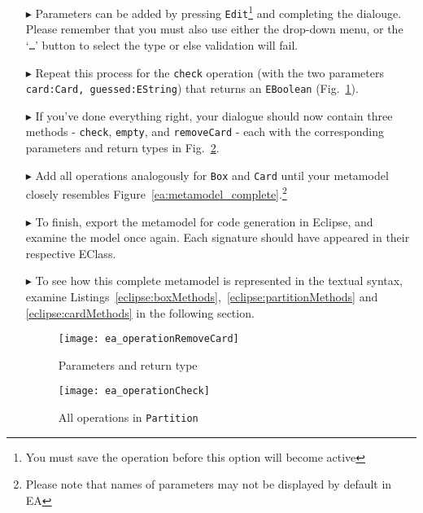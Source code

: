 \begin{enumerate}
\item[$\blacktriangleright$] Parameters can be added by pressing \texttt{Edit}\footnote{You must save the operation before this option will become active} and
completing the dialouge. Please remember that you must also use either the drop-down menu, or the `\texttt{\ldots}' button to select the type or else validation
will fail.

\item[$\blacktriangleright$] Repeat this process for the \texttt{check} operation (with the two parameters \texttt{card:Card, guessed:EString}) that returns an \texttt{EBoolean} (Fig.~\ref{ea:operation_parameters}). 

\item[$\blacktriangleright$] If you've done everything right, your dialogue should now contain three methods - \texttt{check}, \texttt{empty}, and
\texttt{removeCard} - each with the corresponding parameters and return types in Fig.~\ref{ea:operation_partition}.


\item[$\blacktriangleright$] Add all operations analogously for \texttt{Box} and \texttt{Card} until your metamodel closely resembles
Figure~\ref{ea:metamodel_complete}.\footnote{Please note that names of parameters may not be displayed by default in EA}

\item[$\blacktriangleright$] To finish, export the metamodel for code generation in Eclipse, and examine the model once again. Each signature should have
appeared in their respective EClass.

\item[$\blacktriangleright$] To see how this complete metamodel is represented in the textual syntax, examine Listings~\ref{eclipse:boxMethods},~\ref{eclipse:partitionMethods} and~ \ref{eclipse:cardMethods} in the
following section. 

\newpage

\vspace*{1cm}

\begin{figure}[htbp]
	\centering
  \texttt{[image: ea\_operationRemoveCard]}
	\caption{Parameters and return type}
	\label{ea:operation_parameters}
\end{figure}

\vspace{1cm}

\begin{figure}[h!]
	\centering
  \texttt{[image: ea\_operationCheck]}
	\caption{All operations in \texttt{Partition}}
	\label{ea:operation_partition}
\end{figure}


\end{enumerate}
